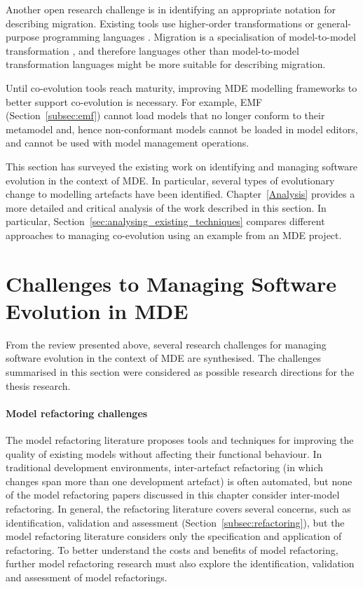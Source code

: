 Another open research challenge is in identifying an appropriate notation for describing migration. Existing \cc tools use higher-order transformations \cite{wachsmuth07metamodel,cicchetti08automating} or general-purpose programming languages \cite{herrmannsdoerfer09cope}. Migration is a specialisation of model-to-model transformation \cite{sprinkle04domain}, and therefore languages other than model-to-model transformation languages might be more suitable for describing migration.

Until co-evolution tools reach maturity, improving MDE modelling frameworks to better support co-evolution is necessary. For example, EMF (Section~\ref{subsec:emf}) cannot load models that no longer conform to their metamodel and, hence non-conformant models cannot be loaded in model editors, and cannot be used with model management operations.

This section has surveyed the existing work on identifying and managing software evolution in the context of MDE. In particular, several types of evolutionary change to modelling artefacts have been identified. Chapter~\ref{Analysis} provides a more detailed and critical analysis of the work described in this section. In particular, Section~\ref{sec:analysing_existing_techniques} compares different approaches to managing co-evolution using an example from an MDE project.

\section[Challenges to Managing Software Evolution in MDE][Challenges to Managing Evolution in MDE]{Challenges to Managing Software Evolution in MDE}
From the review presented above, several research challenges for managing software evolution in the context of MDE are synthesised. The challenges summarised in this section were considered as possible research directions for the thesis research.

\paragraph{Model refactoring challenges} The model refactoring literature proposes tools and techniques for improving the quality of existing models without affecting their functional behaviour. In traditional development environments, inter-artefact refactoring (in which changes span more than one development artefact) is often automated, but none of the model refactoring papers discussed in this chapter consider inter-model refactoring. In general, the refactoring literature covers several concerns, such as identification, validation and assessment (Section~\ref{subsec:refactoring}), but the model refactoring literature considers only the specification and application of refactoring. To better understand the costs and benefits of model refactoring, further model refactoring research must also explore the identification, validation and assessment of model refactorings.

